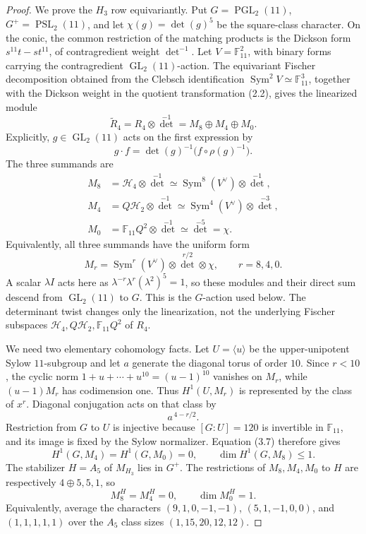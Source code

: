 \documentclass[11pt]{article}
\theoremstyle{definition}
\theoremstyle{remark}
\newcommand{\F}{\mathbb{F}}
\begin{document}
\begin{proof}
We prove the \(H_3\) row equivariantly.  Put
\(G=\operatorname{PGL}_2(11)\),
\(G^+=\operatorname{PSL}_2(11)\), and let
\(\chi(g)=\det(g)^5\) be the square-class character.  On the conic, the
common restriction of the matching products is the Dickson form
\(s^{11}t-st^{11}\), of contragredient weight \(\det^{-1}\).
Let \(V=\F_{11}^2\), with binary forms carrying the contragredient
\(\operatorname{GL}_2(11)\)-action.  The equivariant Fischer decomposition
obtained from the Clebsch identification
\(\operatorname{Sym}^2V\simeq\F_{11}^3\), together with the Dickson
weight in the quotient transformation (2.2), gives the linearized module
\[
 \widetilde R_4=R_4\otimes\det^{-1}
  =M_8\oplus M_4\oplus M_0.                       \tag{3.5}
\]
Explicitly, \(g\in\operatorname{GL}_2(11)\) acts on the first expression
by
\[
 g\cdot f=\det(g)^{-1}\bigl(f\circ\rho(g)^{-1}\bigr).
\]
The three summands are
\[
\begin{split}
 M_8&=\mathcal H_4\otimes\det^{-1}
      \simeq\operatorname{Sym}^8(V^\vee)\otimes\det^{-1},\\
 M_4&=Q\mathcal H_2\otimes\det^{-1}
      \simeq\operatorname{Sym}^4(V^\vee)\otimes\det^{-3},\\
 M_0&=\F_{11}Q^2\otimes\det^{-1}
      \simeq\det^{-5}=\chi .
\end{split}                                         \tag{3.6}
\]
Equivalently, all three summands have the uniform form
\[
 M_r=\operatorname{Sym}^r(V^\vee)\otimes
       \det^{r/2}\otimes\chi,\qquad r=8,4,0.
\]
A scalar \(\lambda I\) acts here as
\(\lambda^{-r}\lambda^r(\lambda^2)^5=1\), so these modules and their
direct sum descend from \(\operatorname{GL}_2(11)\) to \(G\).  This is
the \(G\)-action used below.  The determinant twist changes only the
linearization, not the underlying Fischer subspaces
\(\mathcal H_4,Q\mathcal H_2,\F_{11}Q^2\) of \(R_4\).

We need two elementary cohomology facts.  Let
\(U=\langle u\rangle\) be the upper-unipotent Sylow \(11\)-subgroup
and let \(a\) generate the diagonal torus of order \(10\).
Since \(r<10\), the cyclic norm
\(1+u+\cdots+u^{10}=(u-1)^{10}\) vanishes on \(M_r\), while
\((u-1)M_r\) has codimension one.  Thus \(H^1(U,M_r)\) is represented by
the class of \(x^r\).  Diagonal conjugation acts on that class by
\[
 a^{\,4-r/2}.                                      \tag{3.7}
\]
Restriction from \(G\) to \(U\) is injective because
\([G:U]=120\) is invertible in \(\F_{11}\), and its image is fixed by the
Sylow normalizer.  Equation (3.7) therefore gives
\[
 H^1(G,M_4)=H^1(G,M_0)=0,\qquad
 \dim H^1(G,M_8)\le1.                              \tag{3.8}
\]
The stabilizer \(H=A_5\) of \(M_{H_3}\) lies in \(G^+\).
The restrictions of \(M_8,M_4,M_0\) to \(H\) are respectively
\(4\oplus5,5,1\), so
\[
 M_8^H=M_4^H=0,\qquad \dim M_0^H=1.                \tag{3.9}
\]
Equivalently, average the characters
\((9,1,0,-1,-1)\), \((5,1,-1,0,0)\), and
\((1,1,1,1,1)\) over the \(A_5\) class sizes
\((1,15,20,12,12)\).


\end{proof}
\end{document}
